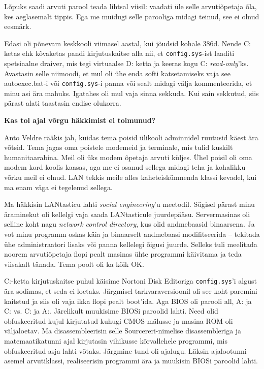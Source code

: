 Lõpuks saadi arvuti parool teada lihtsal viisil: vaadati üle selle
arvutiõpetaja õla, kes aeglasemalt tippis. Ega me muidugi
selle parooliga midagi teinud, see ei olnud eesmärk. 

Edasi oli põnevam keskkooli viimasel aastal, kui jõudsid kohale 386d. Nende C: ketas ehk
kõvaketas pandi kirjutuskaitse alla nii, et
\verb|config.sys|-ist laaditi spetsiaalne draiver, mis tegi virtuaalse D: ketta ja keeras kogu C:
\emph{read-only}'ks. Avastasin selle niimoodi, et mul oli ühe enda
softi katsetamiseks vaja see autoexec.bat-i või \verb|config.sys|-i panna või
sealt midagi välja kommenteerida, et minu asi ära mahuks. Igatahes oli mul vaja sinna sekkuda. Kui sain sekkutud, siis pärast
alati taastasin endise olukorra.

\textbf{Kas tol ajal võrgu häkkimist ei toimunud?}

Anto Veldre rääkis jah, kuidas tema poisid
ülikooli adminnidel ruutusid käest ära võtsid. Tema jagas oma poistele
modemeid ja terminale, mis tulid kuskilt humanitaarabina. Meil oli üks modem
õpetaja arvuti küljes. Ühel poisil oli oma modem kord koolis kaasas, aga me ei osanud sellega midagi teha ja kohalikku võrku meil ei olnud.
LAN tekkis meile alles kaheteiskümnenda
klassi kevadel, kui ma enam väga ei tegelenud sellega. 

Ma häkkisin LANtasticu
lahti \emph{social engineering}'u meetodil. Sügisel pärast minu äraminekut oli
kellelgi vaja saada LANtasticule juurdepääsu. Servermasinas oli selline koht
nagu \emph{network control directory}, kus olid andmebaasid binaarsena. Ja vot
minu programm oskas käia ja binaarselt andmebaasi modifitseerida -- tekitada
ühe administraatori lisaks või panna kellelegi õigusi juurde. Selleks
tuli meelitada noorem arvutiõpetaja flopi pealt masinas ühte programmi käivitama ja teda viisakalt tänada. Tema poolt oli ka kõik OK.

C:-ketta kirjutuskaitse puhul käisime Nortoni Disk
Editoriga \verb|config.sys|'i algust ära sodimas, et seda ei
loetaks. Järgmisel tarkvaraversioonil oli see koht paremini kaitstud ja siis
oli vaja ikka flopi pealt boot'ida. Aga BIOS oli parooli all, A: ja C: vs. C: ja
A:. Järelikult muukisime BIOSi paroolid lahti. Need olid obfuskeeritud
kujul kirjutatud kuhugi CMOS-mälusse ja masina ROM oli väljaloetav. Ma disassembleerisin selle Sourcereri-nimelise disassembleriga ja matemaatikatunni ajal kirjutasin vihikusse kõrvallehele programmi,
mis obfuskeeritud asja lahti võtaks. Järgmine tund oli ajalugu. Läksin
ajalootunni asemel arvutiklassi, realiseerisin programmi ära ja muukisin
BIOSi paroolid lahti. 

